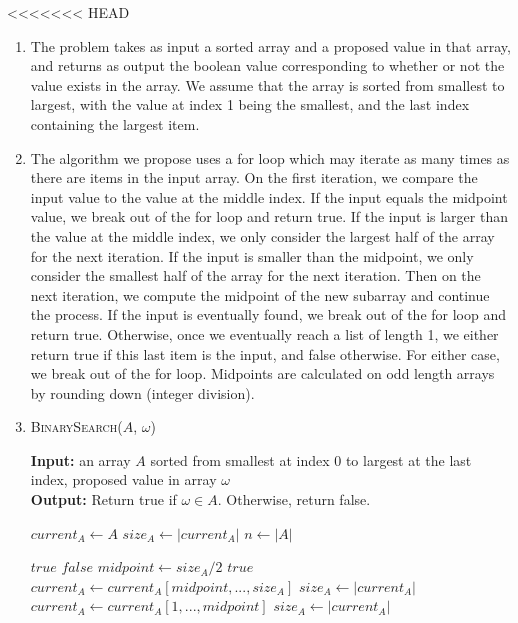 \documentclass{article}
\begin{document}
<<<<<<< HEAD
\begin{enumerate}
	\item The problem takes as input a sorted array and a proposed value in that array, and returns
		as output the boolean value corresponding to whether or not the value exists in the array.
		We assume that the array is sorted from smallest to largest, with the value at index 1
		being the smallest, and the last index containing the largest item.
	\item The algorithm we propose uses a for loop which may iterate as many times as there are items in
		the input array. On the first iteration, we compare the input value to the value at the middle
		index. If the input equals the midpoint value, we break out of the for loop and return true.
		If the input is larger than the value at the middle index, we only consider the largest
		half of the array for the next iteration. If the input is smaller than the midpoint, we only
		consider the smallest half of the array for the next iteration. Then on the next iteration,
		we compute the midpoint of the new subarray and continue the process. If the input is eventually
		found, we break out of the for loop and return true. Otherwise, once we eventually reach
		a list of length 1, we either return true if this last item is the input, and false otherwise.
		For either case, we break out of the for loop. Midpoints are calculated on odd length arrays
		by rounding down (integer division).
        \item
                \begin{algorithm}\caption{\textsc{BinarySearch}($A$, $\omega$)}\label{alg:bs}
                        {\bf Input:} an array $A$ sorted from smallest at index 0 to largest at the last index,
                        proposed value in array $\omega$\\
                        {\bf Output:} Return true if $\omega \in A$. Otherwise, return false.
                \begin{algorithmic}[1]

			\State $current_A \gets A$
                        \State $size_A \gets |current_A|$
			\State $n \gets |A|$

						\State \Return $true$
					\Else
						\State \Return $false$
					\EndIf
				\EndIf
				\State $midpoint \gets size_A/2$
                              		\State \Return $true$
				\EndIf
				\If{$\omega > current_A[midpoint$}
					\State $current_A \gets current_A[midpoint,...,size_A]$
					\State $size_A \gets |current_A|$
					\State $current_A \gets current_A[1,...,midpoint]$
					\State $size_A \gets |current_A|$
				\EndIf
                        \EndWhile


\end{algorithmic}
\end{algorithm}
\end{enumerate}
\end{document}
